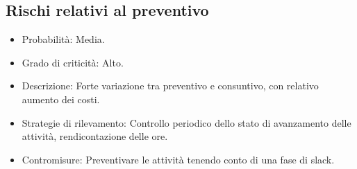 \subsection{Rischi relativi al preventivo}
\begin{itemize}
  \item Probabilità: Media.
  \item Grado di criticità: Alto.
  \item Descrizione: Forte variazione tra preventivo e consuntivo, con relativo aumento dei costi.
  \item Strategie di rilevamento: Controllo periodico dello stato di avanzamento delle attività, rendicontazione delle ore.
  \item Contromisure: Preventivare le attività tenendo conto di una fase di slack.
\end{itemize}





